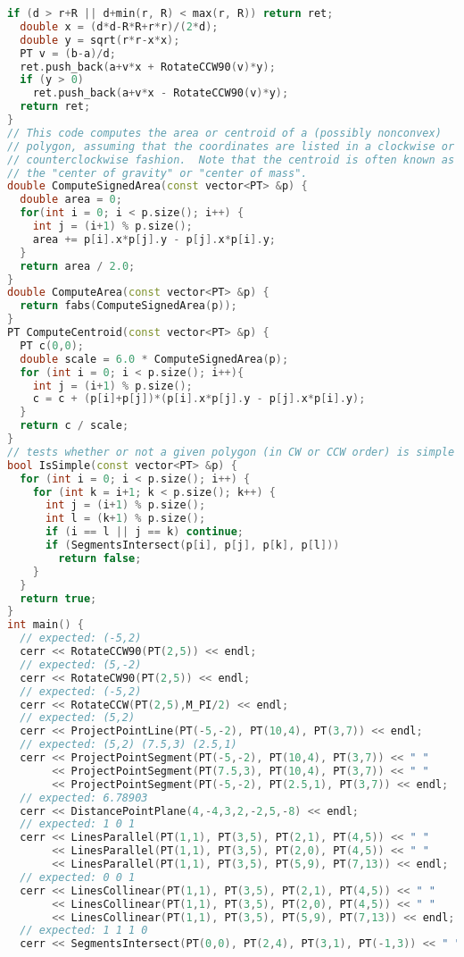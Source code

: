 \begin{lstlisting}[language=C++]
  if (d > r+R || d+min(r, R) < max(r, R)) return ret;
  double x = (d*d-R*R+r*r)/(2*d);
  double y = sqrt(r*r-x*x);
  PT v = (b-a)/d;
  ret.push_back(a+v*x + RotateCCW90(v)*y);
  if (y > 0)
    ret.push_back(a+v*x - RotateCCW90(v)*y);
  return ret;
}
// This code computes the area or centroid of a (possibly nonconvex)
// polygon, assuming that the coordinates are listed in a clockwise or
// counterclockwise fashion.  Note that the centroid is often known as
// the "center of gravity" or "center of mass".
double ComputeSignedArea(const vector<PT> &p) {
  double area = 0;
  for(int i = 0; i < p.size(); i++) {
    int j = (i+1) % p.size();
    area += p[i].x*p[j].y - p[j].x*p[i].y;
  }
  return area / 2.0;
}
double ComputeArea(const vector<PT> &p) {
  return fabs(ComputeSignedArea(p));
}
PT ComputeCentroid(const vector<PT> &p) {
  PT c(0,0);
  double scale = 6.0 * ComputeSignedArea(p);
  for (int i = 0; i < p.size(); i++){
    int j = (i+1) % p.size();
    c = c + (p[i]+p[j])*(p[i].x*p[j].y - p[j].x*p[i].y);
  }
  return c / scale;
}
// tests whether or not a given polygon (in CW or CCW order) is simple
bool IsSimple(const vector<PT> &p) {
  for (int i = 0; i < p.size(); i++) {
    for (int k = i+1; k < p.size(); k++) {
      int j = (i+1) % p.size();
      int l = (k+1) % p.size();
      if (i == l || j == k) continue;
      if (SegmentsIntersect(p[i], p[j], p[k], p[l])) 
        return false;
    }
  }
  return true;
}
int main() {
  // expected: (-5,2)
  cerr << RotateCCW90(PT(2,5)) << endl;
  // expected: (5,-2)
  cerr << RotateCW90(PT(2,5)) << endl;
  // expected: (-5,2)
  cerr << RotateCCW(PT(2,5),M_PI/2) << endl;
  // expected: (5,2)
  cerr << ProjectPointLine(PT(-5,-2), PT(10,4), PT(3,7)) << endl;
  // expected: (5,2) (7.5,3) (2.5,1)
  cerr << ProjectPointSegment(PT(-5,-2), PT(10,4), PT(3,7)) << " "
       << ProjectPointSegment(PT(7.5,3), PT(10,4), PT(3,7)) << " "
       << ProjectPointSegment(PT(-5,-2), PT(2.5,1), PT(3,7)) << endl;
  // expected: 6.78903
  cerr << DistancePointPlane(4,-4,3,2,-2,5,-8) << endl;
  // expected: 1 0 1
  cerr << LinesParallel(PT(1,1), PT(3,5), PT(2,1), PT(4,5)) << " "
       << LinesParallel(PT(1,1), PT(3,5), PT(2,0), PT(4,5)) << " "
       << LinesParallel(PT(1,1), PT(3,5), PT(5,9), PT(7,13)) << endl;
  // expected: 0 0 1
  cerr << LinesCollinear(PT(1,1), PT(3,5), PT(2,1), PT(4,5)) << " "
       << LinesCollinear(PT(1,1), PT(3,5), PT(2,0), PT(4,5)) << " "
       << LinesCollinear(PT(1,1), PT(3,5), PT(5,9), PT(7,13)) << endl;
  // expected: 1 1 1 0
  cerr << SegmentsIntersect(PT(0,0), PT(2,4), PT(3,1), PT(-1,3)) << " "

\end{lstlisting}
